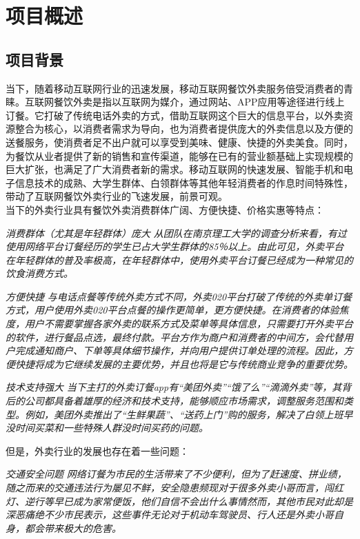 \documentclass[violet]{main}
\begin{document}
	\chapter{项目概述}
		\section{项目背景}
			当下，随着移动互联网行业的迅速发展，移动互联网餐饮外卖服务倍受消费者的青睐。互联网餐饮外卖是指以互联网为媒介，通过网站、APP应用等途径进行线上订餐。它打破了传统电话外卖的方式，借助互联网这个巨大的信息平台，以外卖资源整合为核心，以消费者需求为导向，也为消费者提供庞大的外卖信息以及方便的送餐服务，使消费者足不出户就可以享受到美味、健康、快捷的外卖美食。同时，为餐饮从业者提供了新的销售和宣传渠道，能够在已有的营业额基础上实现规模的巨大扩张，也满足了广大消费者新的需求。移动互联网的快速发展、智能手机和电子信息技术的成熟、大学生群体、白领群体等其他年轻消费者的作息时间特殊性，带动了互联网餐饮外卖行业的飞速发展，前景可观。
			\\\indent 当下的外卖行业具有餐饮外卖消费群体广阔、方便快捷、价格实惠等特点：
			\begin{strength}{\it 消费群体（尤其是年轻群体）庞大}{}
				\it 从团队在南京理工大学的调查分析来看，有过使用网络平台订餐经历的学生已占大学生群体的85％以上。由此可见，外卖平台在年轻群体的普及率极高，在年轻群体中，使用外卖平台订餐已经成为一种常见的饮食消费方式。
			\end{strength}
			\begin{strength}{\it 方便快捷}{}
				\it 与电话点餐等传统外卖方式不同，外卖020平台打破了传统的外卖单订餐方式，用户使用外卖020平台点餐的操作更简单，更方便快捷。在消费者的体验焦度，用户不需要掌握各家外卖的联系方式及菜单等具体信息，只需要打开外卖平台的软件，进行餐品点选，最终付款。平台方作为商户和消费者的中间方，会代替用户完成通知商户、下单等具体细节操作，并向用户提供订单处理的流程。因此，方便快捷将成为它继续发展的主要优势，并且也将是它与传统商业竞争的重要优势。
			\end{strength}
			\begin{strength}{\it 技术支持强大}{}
				\it 当下主打的外卖订餐app有“美团外卖”“饿了么”“滴滴外卖”等，其背后的公司都具备着雄厚的经济和技术支持，能够顺应市场需求，调整服务范围和类型。例如，美团外卖推出了“生鲜果蔬”、“送药上门”购的服务，解决了白领上班早没时间买菜和一些特殊人群没时间买药的问题。
			\end{strength}
			但是，外卖行业的发展也存在着一些问题：
			\begin{weakness}{\it 交通安全问题}{}
				\it 网络订餐为市民的生活带来了不少便利，但为了赶速度、拼业绩，随之而来的交通违法行为屡见不鲜，安全隐患频现对于很多外卖小哥而言，闯红灯、逆行等早已成为家常便饭，他们自信不会出什么事情然而，其他市民对此却是深恶痛绝不少市民表示，这些事件无论对于机动车驾驶员、行人还是外卖小哥自身，都会带来极大的危害。
			\end{weakness}
\end{document}
